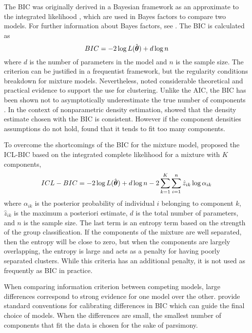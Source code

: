 The BIC was originally derived in a Bayesian framework as an approximate to the integrated likelihood  \cite{schwarz1978}, which are used in Bayes factors to compare two models. For further information about Bayes factors, see \textcite{kass1995}. The BIC is calculated as
$$BIC= -2 \log L(\hat{\boldsymbol\theta}) + d\log n $$
where $d$ is the number of parameters in the model and $n$ is the sample size. The criterion can be justified in a frequentist framework, but the regularity conditions breakdown for mixture models. Nevertheless, \textcite{fraley1998} noted considerable theoretical and practical evidence to support the use for clustering. Unlike the AIC, the BIC has been shown not to asymptotically underestimate the true number of components \cite{leroux1992}. In the context of nonparametric density estimation,  \textcite{roeder1997} showed that the density estimate chosen with the BIC is consistent. However if the component densities assumptions do not hold, \textcite{biernacki2000} found that it tends to fit too many components. 

To overcome the shortcomings of the BIC for the mixture model, \textcite{biernacki2000} proposed the ICL-BIC based on the integrated complete likelihood for a mixture with $K$ components,
$$ICL-BIC = -2\log L(\hat{\boldsymbol\theta}) + d\log n - 2\sum^{K}_{k=1}\sum^{n}_{i=1}\hat{z}_{ik}\log \alpha_{ik}$$
where $\alpha_{ik}$ is the posterior probability of individual $i$ belonging to component $k$, $\hat{z}_{ik}$ is the maximum a posteriori estimate, $d$ is the total number of parameters, and $n$ is the sample size. The last term is an entropy term based on the strength of the group classification. If the components of the mixture are well separated, then the entropy will be close to zero, but when the components are largely overlapping, the entropy is large and acts as a penalty for having poorly separated clusters. While this criteria has an additional penalty, it is not used as frequently as BIC in practice.

When comparing information criterion between competing models, large differences correspond to strong evidence for one model over the other. \Textcite{kass1995} provide standard conventions for calibrating differences in BIC which can guide the final choice of models. When the differences are small, the smallest number of components that fit the data is chosen for the sake of parsimony.

